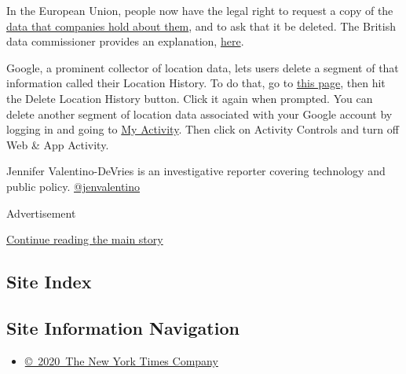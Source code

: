In the European Union, people now have the legal right to request a copy
of the
\href{https://www.nytimes.com/interactive/2018/05/20/technology/what-data-companies-have-on-you.html}{data
that companies hold about them}, and to ask that it be deleted. The
British data commissioner provides an explanation,
\href{https://ico.org.uk/for-organisations/guide-to-the-general-data-protection-regulation-gdpr/individual-rights/right-of-access/}{here}.

Google, a prominent collector of location data, lets users delete a
segment of that information called their Location History. To do that,
go to \href{https://www.google.com/locationhistory/delete}{this page},
then hit the Delete Location History button. Click it again when
prompted. You can delete another segment of location data associated
with your Google account by logging in and going to
\href{https://myactivity.google.com/myactivity}{My Activity}. Then click
on Activity Controls and turn off Web \& App Activity.

Jennifer Valentino-DeVries is an investigative reporter covering
technology and public policy.
\href{https://twitter.com/jenvalentino}{@jenvalentino}

Advertisement

\protect\hyperlink{after-bottom}{Continue reading the main story}

\hypertarget{site-index}{%
\subsection{Site Index}\label{site-index}}

\hypertarget{site-information-navigation}{%
\subsection{Site Information
Navigation}\label{site-information-navigation}}

\begin{itemize}
\tightlist
\item
  \href{https://help.nytimes.com/hc/en-us/articles/115014792127-Copyright-notice}{©~2020~The
  New York Times Company}
\end{itemize}

